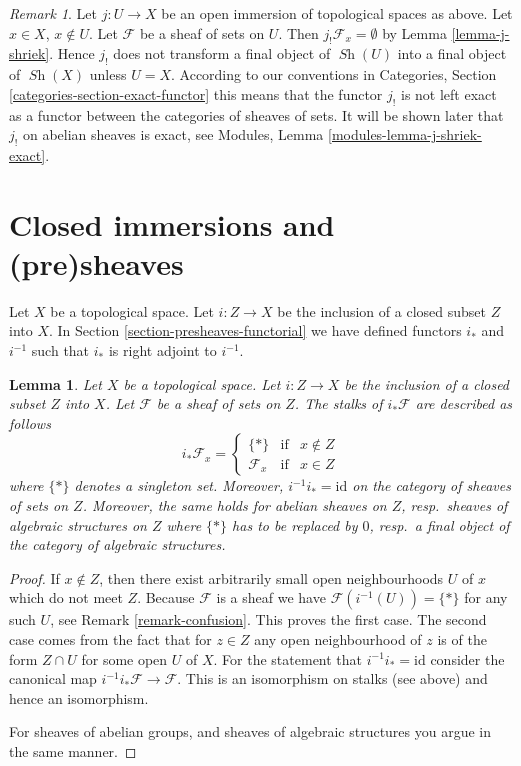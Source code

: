 \documentclass{stacks-project}
\theoremstyle{plain}
\newtheorem{lemma}[subsection]{Lemma}
\theoremstyle{definition}
\theoremstyle{remark}
\newtheorem{remark}[subsection]{Remark}
\numberwithin{equation}{subsection}
\def\Sh{\mathop{\mathit{Sh}}\nolimits}
\begin{document}
\begin{remark}
\label{remark-j-shriek-not-exact}
Let $j : U \to X$ be an open immersion of topological spaces as above.
Let $x \in X$, $x \not \in U$. Let $\mathcal{F}$ be a sheaf of sets
on $U$. Then $j_!\mathcal{F}_x = \emptyset$ by Lemma \ref{lemma-j-shriek}.
Hence $j_!$ does not transform a final object of $\Sh(U)$
into a final object of $\Sh(X)$ unless $U = X$.
According to our conventions in
Categories, Section \ref{categories-section-exact-functor}
this means that the functor $j_!$ is not left exact
as a functor between the categories of sheaves of sets.
It will be shown later that $j_!$ on abelian sheaves is exact,
see Modules, Lemma \ref{modules-lemma-j-shriek-exact}.
\end{remark}








\section{Closed immersions and (pre)sheaves}
\label{section-closed-immersions}

\noindent
Let $X$ be a topological space.
Let $i : Z \to X$ be the inclusion of a closed subset $Z$ into $X$.
In Section \ref{section-presheaves-functorial} we have defined
functors $i_*$ and $i^{-1}$ such that $i_*$ is right adjoint to
$i^{-1}$.

\begin{lemma}
\label{lemma-stalks-closed-pushforward}
Let $X$ be a topological space.
Let $i : Z \to X$ be the inclusion of a closed subset $Z$ into $X$.
Let $\mathcal{F}$ be a sheaf of sets on $Z$.
The stalks of $i_*\mathcal{F}$ are described as follows
$$
i_*\mathcal{F}_x =
\left\{
\begin{matrix}
\{*\} & \text{if} & x \not \in Z \\
\mathcal{F}_x & \text{if} & x \in Z
\end{matrix}
\right.
$$
where $\{*\}$ denotes a singleton set. Moreover,
$i^{-1}i_* = \text{id}$ on the category of sheaves
of sets on $Z$. Moreover, the same holds for abelian
sheaves on $Z$, resp.\ sheaves of algebraic structures on $Z$
where $\{*\}$ has to be replaced by $0$, resp.\ a
final object of the category of algebraic structures.
\end{lemma}

\begin{proof}
If $x \not \in Z$, then there exist arbitrarily small open
neighbourhoods $U$ of $x$ which do not meet $Z$.
Because $\mathcal{F}$ is a sheaf
we have $\mathcal{F}(i^{-1}(U)) = \{*\}$ for any such $U$,
see Remark \ref{remark-confusion}. This proves the first case.
The second case comes from the fact that for $z \in Z$
any open neighbourhood of $z$ is of the form $Z \cap U$ for
some open $U$ of $X$. For the statement that
$i^{-1}i_* = \text{id}$ consider the canonical map
$i^{-1}i_*\mathcal{F} \to \mathcal{F}$. This is an isomorphism
on stalks (see above) and hence an isomorphism.

\medskip\noindent
For sheaves of abelian groups, and sheaves of algebraic structures
you argue in the same manner.
\end{proof}
\end{document}
